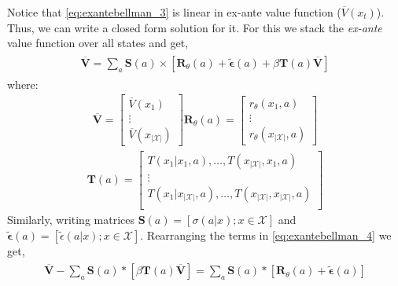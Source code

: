 \documentclass{article}
\begin{document}
Notice that \eqref{eq:exantebellman_3} is linear in ex-ante value function ($\overline{V}(x_t)$). Thus, we can write a closed form solution for it.
For this we stack the \emph{ex-ante} value function over all states and get,
\begin{align} \label{eq:exantebellman_4}
    \begin{split}
    \overline{\mathbf{V}}=\sum_{a}\mathbf{S}(a) \times \left[\mathbf{R}_{\theta}(a)+\tilde{\bm{\epsilon}}(a)+\beta \mathbf{T}(a) \overline{\mathbf{V}}\right]
    \end{split}
\end{align}
where:
\begin{align}
\overline{\mathbf{V}}=\left[\begin{array}{c}\overline{V}(x_1)\\\vdots\\\overline{V}(x_{|\mathcal{X}|})\end{array}\right]
\mathbf{R}_{\theta}(a)=\left[\begin{array}{c}r_{\theta}(x_1,a)\\\vdots\\ r_{\theta}(x_{|\mathcal{X}|},a)\end{array}\right]
\end{align}
\begin{align}
\mathbf{T}(a)=\left[\begin{array}{ccc}
T(x_1|x_1,a),\dots,T(x_{|\mathcal{X}|},x_1,a)\\
\vdots\\
T(x_1|x_{|\mathcal{X}|},a),\dots,T(x_{|\mathcal{X}|},x_{|\mathcal{X}|},a)\\
\end{array}\right]
\end{align}
Similarly, writing matrices $\mathbf{S}(a) = [\sigma(a|x); x\in\mathcal{X}]$ and $\tilde{\bm{\epsilon}}(a)=[\tilde{\epsilon}(a|x); x\in\mathcal{X}]$.
Rearranging the terms in \eqref{eq:exantebellman_4} we get,
\begin{align}
    \begin{split}
    \overline{\mathbf{V}}-\sum_{a}\mathbf{S}(a) *\left[ \beta \mathbf{T}(a) \overline{\mathbf{V}}\right]=\sum_{a}\mathbf{S}(a) *\left[ \mathbf{R}_{\theta}(a)+\tilde{\bm{\epsilon}}(a)\right]
    \end{split}
\end{align}
\end{document}
